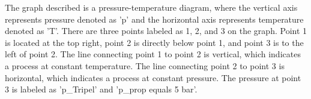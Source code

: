 The graph described is a pressure-temperature diagram, where the vertical axis represents pressure denoted as 'p' and the horizontal axis represents temperature denoted as 'T'. There are three points labeled as 1, 2, and 3 on the graph. Point 1 is located at the top right, point 2 is directly below point 1, and point 3 is to the left of point 2. The line connecting point 1 to point 2 is vertical, which indicates a process at constant temperature. The line connecting point 2 to point 3 is horizontal, which indicates a process at constant pressure. The pressure at point 3 is labeled as 'p_Tripel' and 'p_prop equals 5 bar'.